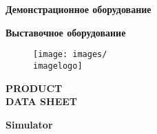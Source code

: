 {    \ifdefined \demoflag %
    \begin{center}
        \large\textbf{\textcolor{TradeMarkNameOneColor}{Демонстрационное оборудование}}
    \end{center}
    \fi

    \ifdefined \showflag %
    \begin{center}
        \large\textbf{\textcolor{TradeMarkNameOneColor}{Выставочное оборудование}}
    \end{center}
    \fi

    \pagebreak
}
\fi

\ifIsLngEng  %
{
    
    \begin{figure}[h]
        \texttt{[image: images/\\imagelogo]}
    \end{figure}

    \vspace*{\fill}

    \noindent
    \Huge\textbf{\textcolor{TradeMarkNameOneColor}{
        PRODUCT\\ 
        DATA SHEET
    }}\par
    
    \vspace*{\fill}
    \vspace*{\fill}
    
    \begin{flushleft}
        
        \noindent                   
        \Large\textbf{\textcolor{TradeMarkNameOneColor}{
            Simulator~\producttype        
        }}\par
    
        \vspace*{\fill}
    
        \noindent         
        \Large\textbf{\textcolor{clColontitulText}{
            \productname        
        }}\par
                 
    \end{flushleft}
         
    \vspace*{\fill}
    \begin{flushright}
        \producttrademarknametitul
    \end{flushright}
    \vspace*{\fill}

}
